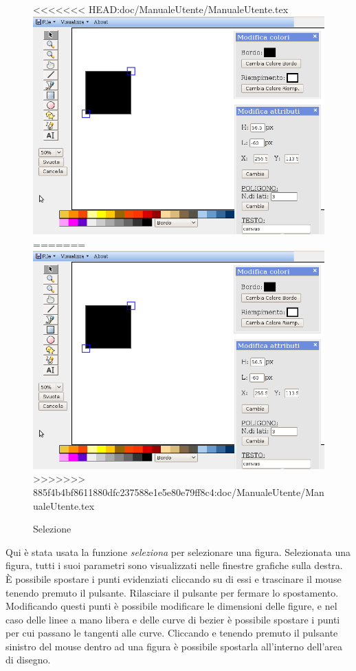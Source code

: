 \begin{figure}[!ht]
\centering
<<<<<<< HEAD:doc/ManualeUtente/ManualeUtente.tex
\includegraphics[scale=0.4]{images/selezione.png}
=======
\includegraphics[scale=1]{images/selezione.png}
>>>>>>> 885f4b4bf8611880dfc237588e1e5e80e79ff8c4:doc/ManualeUtente/ManualeUtente.tex
\caption{Selezione}
\end{figure} 

Qui \`e stata usata la funzione \textit{seleziona} per selezionare una figura. Selezionata una figura, tutti i suoi parametri sono visualizzati nelle finestre grafiche sulla destra. \`E possibile spostare i punti evidenziati cliccando su di essi e trascinare il mouse tenendo premuto il pulsante. Rilasciare il pulsante per fermare lo spostamento. Modificando questi punti \`e possibile modificare le dimensioni delle figure, e nel caso delle linee a mano libera e delle curve di bezier \`e possibile spostare i punti per cui passano le tangenti alle curve. Cliccando e tenendo premuto il pulsante sinistro del mouse dentro ad una figura \`e possibile spostarla all'interno dell'area di disegno.

